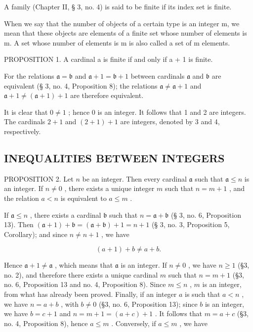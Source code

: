 A family (Chapter II, § 3, no. 4) is said to be finite if its index set is finite.

When we say that the number of objects of a certain type is an integer m, we mean that these objects are elements of a finite set whose number of elements is m. A set whose number of elements is m is also called a set of m elements.

PROPOSITION 1. A cardinal a is finite if and only if a + 1 is finite.

For the relations \(\mathfrak{a} = \mathfrak{b}\) and \(\mathfrak{a} + 1 = \mathfrak{b} + 1\) between cardinals \(\mathfrak{a}\) and \(\mathfrak{b}\) are equivalent (§ 3, no. 4, Proposition 8); the relations \(\mathfrak{a} \neq \mathfrak{a} + 1\) and \(\mathfrak{a} + 1 \neq (\mathfrak{a} + 1) + 1\) are therefore equivalent.

It is clear that \(0 \neq 1\) ; hence 0 is an integer. It follows that 1 and 2 are integers. The cardinals \(2 + 1\) and \((2 + 1) + 1\) are integers, denoted by 3 and 4, respectively.

\subsection{INEQUALITIES BETWEEN INTEGERS}

PROPOSITION 2. Let \(n\) be an integer. Then every cardinal \(\mathfrak{a}\) such that \(\mathfrak{a} \leqslant n\) is an integer. If \(n \neq 0\) , there exists a unique integer \(m\) such that \(n = m + 1\) , and the relation \(a < n\) is equivalent to \(a \leqslant m\) .

If \(\mathfrak{a} \leqslant n\) , there exists a cardinal \(\mathfrak{b}\) such that \(n = \mathfrak{a} + \mathfrak{b}\) (§ 3, no. 6, Proposition 13). Then \((\mathfrak{a} + 1) + \mathfrak{b} = (\mathfrak{a} + \mathfrak{b}) + 1 = n + 1\) (§ 3, no. 3, Proposition 5, Corollary); and since \(n \neq n + 1\) , we have

\[
(a + 1) + b \neq a + b.
\]

Hence \(\mathfrak{a} + 1 \neq \mathfrak{a}\) , which means that \(\mathfrak{a}\) is an integer. If \(n \neq 0\) , we have \(n \geqslant 1\) (§3, no. 2), and therefore there exists a unique cardinal \(m\) such that \(n = m + 1\) (§3, no. 6, Proposition 13 and no. 4, Proposition 8). Since \(m \leqslant n\) , \(m\) is an integer, from what has already been proved. Finally, if an integer \(a\) is such that \(a < n\) , we have \(n = a + b\) , with \(b \neq 0\) (§3, no. 6, Proposition 13); since \(b\) is an integer, we have \(b = c + 1\) and \(n = m + 1 = (a + c) + 1\) . It follows that \(m = a + c\) (§3, no. 4, Proposition 8), hence \(a \leqslant m\) . Conversely, if \(a \leqslant m\) , we have

